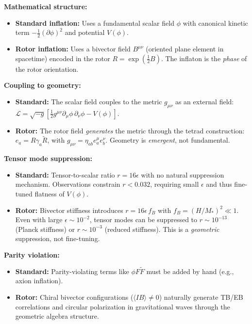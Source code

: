 \documentclass[11pt,a4paper]{article}
\numberwithin{equation}{section}
\theoremstyle{plain}
\theoremstyle{definition}
\theoremstyle{remark}
\begin{document}
\textbf{Mathematical structure:}
\begin{itemize}
  \item \textbf{Standard inflation:} Uses a fundamental scalar field $\phi$ with canonical kinetic term $-\frac{1}{2}(\partial\phi)^2$ and potential $V(\phi)$.
  \item \textbf{Rotor inflation:} Uses a bivector field $B^{\mu\nu}$ (oriented plane element in spacetime) encoded in the rotor $R = \exp(\frac{1}{2}B)$. The inflaton is the \emph{phase} of the rotor orientation.
\end{itemize}

\textbf{Coupling to geometry:}
\begin{itemize}
  \item \textbf{Standard:} The scalar field couples to the metric $g_{\mu\nu}$ as an external field: $\mathcal{L} = \sqrt{-g}\left[\frac{1}{2}g^{\mu\nu}\partial_\mu\phi\,\partial_\nu\phi - V(\phi)\right]$.
  \item \textbf{Rotor:} The rotor field \emph{generates} the metric through the tetrad construction: $e_a = R\gamma_a\widetilde{R}$, with $g_{\mu\nu} = \eta_{ab}e_a^\mu e_b^\nu$. Geometry is \emph{emergent}, not fundamental.
\end{itemize}

\textbf{Tensor mode suppression:}
\begin{itemize}
  \item \textbf{Standard:} Tensor-to-scalar ratio $r = 16\epsilon$ with no natural suppression mechanism. Observations constrain $r < 0.032$, requiring small $\epsilon$ and thus fine-tuned flatness of $V(\phi)$.
  \item \textbf{Rotor:} Bivector stiffness introduces $r = 16\epsilon\, f_B$ with $f_B = (H/M_*)^2 \ll 1$. Even with large $\epsilon \sim 10^{-2}$, tensor modes can be suppressed to $r \sim 10^{-13}$ (Planck stiffness) or $r \sim 10^{-3}$ (reduced stiffness). This is a \emph{geometric} suppression, not fine-tuning.
\end{itemize}

\textbf{Parity violation:}
\begin{itemize}
  \item \textbf{Standard:} Parity-violating terms like $\phi F\tilde{F}$ must be added by hand (e.g., axion inflation).
  \item \textbf{Rotor:} Chiral bivector configurations ($\langle I B \rangle \neq 0$) naturally generate TB/EB correlations and circular polarization in gravitational waves through the geometric algebra structure.
\end{itemize}
\end{document}
